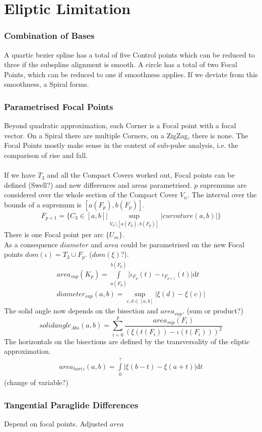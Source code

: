 \documentclass{report}
\begin{document}
\chapter{Eliptic Limitation}
\subsection{Combination of Bases}
A quartic bezier spline has a total of five Control points which can be reduced to three if the subspline alignment is smooth. A circle has a total of two Focal Points, which can be reduced to one if smoothness applies. If we deviate from this smoothness, a Spiral forms.
\subsection{Parametrised Focal Points}
Beyond quadratic approximation, each Corner is a Focal point with a focal vector. On a Spiral there are multiple Corners, on a ZigZag, there is none. The Focal Points mostly make sense in the context of sub-pulse analysis, i.e. the comparison of rise and fall.\\\\
If we have $T_{3}$ and all the Compact Covers worked out, Focal points can be defined (Swell?) and new differences and areas parametrised. $p$ supremums are considered over the whole section of the Compact Cover $V_{n}$. The interval over the bounds of a supremum is $[a(F_{p}),b(F_{p})]$.
\begin{align}
F_{p+1} = \{ C_{3} \in  [a,b]\vert \sup \limits _{V_{n} \setminus [a(F_{p}),b(F_{p})]} \lvert curvature(a,b) \rvert \}
\end{align}
There is one Focal point per arc $\{U_{m}\}$.\\
As a consequence $diameter$ and $area$ could be parametrised on the new Focal points $dom(\iota)=T_{3}\cup F_{p}$. ($dom(\xi)$?).\\
\begin{align}
area_{sup}(K_{p})=\int \limits _{a(F_{p})}^{b(F_{p})} \lvert \iota_{F_{p}}(t)-\iota_{F_{p+1}}(t) \rvert \mathrm{d}t\\
diameter_{sup}(a,b)=\sup \limits _{c,d \in [a,b]} \lvert \xi(d) - \xi(c) \rvert
\end{align}
The solid angle now depends on the bisection and $area_{sup}$. (sum or product?)
\begin{equation}
solidangle_{Abs}(a,b)=\sum \limits _{i=0}^{p} \frac{area_{sup}(F_{i})}{(\xi(t(F_{i}))-\iota(t(F_{i})))^2}
\end{equation}
The horizontals on the bisections are defined by the transversality of the eliptic approximation.
\begin{align}
area_{horiz}(a,b)=\int \limits _{0}^{?} \lvert \xi(b-t)-\xi(a+t) \rvert \mathrm{d}t
\end{align}
(change of variable?)
\subsection{Tangential Paraglide Differences}
Depend on focal points. Adjusted $area$

\printbibliography
\end{document}
